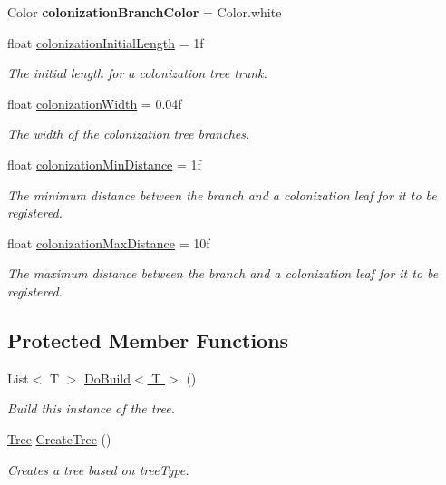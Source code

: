 \begin{DoxyCompactItemize}
\mbox{\label{class_fractal_tree_1_1_tree_builder_ad49cb5210ad4c146bfb44a2c04f47f36}} 
Color {\bfseries colonization\+Branch\+Color} = Color.\+white
\item 
float \hyperlink{class_fractal_tree_1_1_tree_builder_a1cd91a1a14415505680fa2deae9468ca}{colonization\+Initial\+Length} = 1f
\begin{DoxyCompactList}\small\item\em The initial length for a colonization tree trunk. \end{DoxyCompactList}\item 
float \hyperlink{class_fractal_tree_1_1_tree_builder_a22b8c477430d16faa020d724c8573a57}{colonization\+Width} = 0.\+04f
\begin{DoxyCompactList}\small\item\em The width of the colonization tree branches. \end{DoxyCompactList}\item 
float \hyperlink{class_fractal_tree_1_1_tree_builder_ac7abe13cc887bafe266773e33513d69a}{colonization\+Min\+Distance} = 1f
\begin{DoxyCompactList}\small\item\em The minimum distance between the branch and a colonization leaf for it to be registered. \end{DoxyCompactList}\item 
float \hyperlink{class_fractal_tree_1_1_tree_builder_a21cbebdabadaf5d205a038d20db2f702}{colonization\+Max\+Distance} = 10f
\begin{DoxyCompactList}\small\item\em The maximum distance between the branch and a colonization leaf for it to be registered. \end{DoxyCompactList}\end{DoxyCompactItemize}
\subsection*{Protected Member Functions}
\begin{DoxyCompactItemize}
\item 
List$<$ T $>$ \hyperlink{class_fractal_tree_1_1_tree_builder_aa2d0ae2616577e6c0cdf7e68cdf4dffb}{Do\+Build$<$ T $>$} ()
\begin{DoxyCompactList}\small\item\em Build this instance of the tree. \end{DoxyCompactList}\item 
\hyperlink{interface_fractal_tree_1_1_tree}{Tree} \hyperlink{class_fractal_tree_1_1_tree_builder_a8bea11ef52d57a75292efd34e6f40779}{Create\+Tree} ()
\begin{DoxyCompactList}\small\item\em Creates a tree based on tree\+Type. \end{DoxyCompactList}\end{DoxyCompactItemize}



